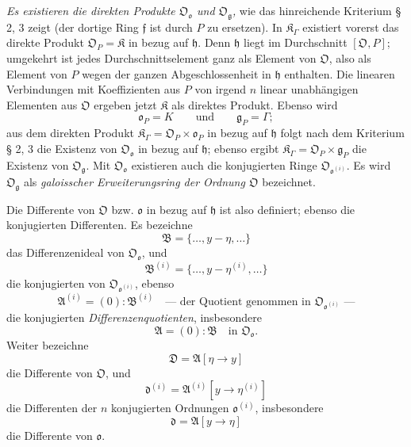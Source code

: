 \emph{Es existieren die direkten Produkte $\mathfrak O_{\mathfrak o}$ und $\mathfrak O_{\mathfrak g}$,} wie das hinreichende Kriterium § 2, 3 zeigt (der dortige Ring $\mathfrak f$ ist durch $P$ zu ersetzen). In $\mathfrak K_\Gamma$ existiert vorerst das direkte Produkt $\mathfrak O_P=\mathfrak K$ in bezug auf $\mathfrak h$. Denn $\mathfrak h$ liegt im Durchschnitt $[\mathfrak O,P]$; umgekehrt ist jedes Durchschnittselement ganz als Element von $\mathfrak O$, also als Element von $P$ wegen der ganzen Abgeschlossenheit in $\mathfrak h$ enthalten. Die linearen Verbindungen mit Koeffizienten aus $P$ von irgend $n$ linear unabhängigen Elementen aus $\mathfrak O$ ergeben jetzt $\mathfrak K$ als direktes Produkt. Ebenso wird
\[
\mathfrak o_P=K
\qquad\text{und}\qquad
\mathfrak g_P=\Gamma;
\]
aus dem direkten Produkt $\mathfrak K_\Gamma=\mathfrak O_P\times\mathfrak o_P$ in bezug auf $\mathfrak h$ folgt nach dem Kriterium § 2, 3 die Existenz von $\mathfrak O_{\mathfrak o}$ in bezug auf $\mathfrak h$; ebenso ergibt $\mathfrak K_\Gamma=\mathfrak O_P\times\mathfrak g_P$ die Existenz von $\mathfrak O_{\mathfrak g}$. Mit $\mathfrak O_{\mathfrak o}$ existieren auch die konjugierten Ringe $\mathfrak O_{\mathfrak o^{(i)}}$. Es wird $\mathfrak O_{\mathfrak g}$ als \emph{galoisscher Erweiterungsring der Ordnung $\mathfrak O$} bezeichnet.

Die Differente von $\mathfrak O$ bzw. $\mathfrak o$ in bezug auf $\mathfrak h$ ist also definiert; ebenso die konjugierten Differenten. Es bezeichne
\[
\mathfrak B=\{\ldots,y-\eta,\ldots\}
\]
das Differenzenideal von $\mathfrak O_{\mathfrak o}$, und
\[
\mathfrak B^{(i)}=\{\ldots,y-\eta^{(i)},\ldots\}
\]
die konjugierten von $\mathfrak O_{\mathfrak o^{(i)}}$, ebenso
\[
\mathfrak A^{(i)}=(0):\mathfrak B^{(i)}
\quad\text{--- der Quotient genommen in $\mathfrak O_{\mathfrak o^{(i)}}$ ---}
\]
die konjugierten \emph{Differenzenquotienten}, insbesondere
\[
\mathfrak A=(0):\mathfrak B\quad\text{in }\mathfrak O_{\mathfrak o}.
\]
Weiter bezeichne
\[
\mathfrak D=\mathfrak A[\eta\to y]
\]
die Differente von $\mathfrak O$, und
\[
\mathfrak d^{(i)}=\mathfrak A^{(i)}[y\to\eta^{(i)}]
\]
die Differenten der $n$ konjugierten Ordnungen $\mathfrak o^{(i)}$, insbesondere
\[
\mathfrak d=\mathfrak A[y\to\eta]
\]
die Differente von $\mathfrak o$.

